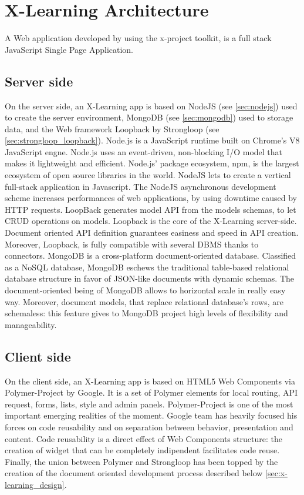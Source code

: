 \section{X-Learning  Architecture}
\label{sec:x-learning_architecture}

A Web application developed by using the x-project toolkit, is a full stack JavaScript Single Page Application.


\subsection{Server side}
\label{subsec:server_side}

On the server side, an X-Learning app is based on NodeJS (see \ref{sec:nodejs}) used to create the server environment, MongoDB (see \ref{sec:mongodb}) used to storage data, and the Web framework Loopback by Strongloop (see \ref{sec:strongloop_loopback}).
Node.js is a JavaScript runtime built on Chrome’s  V8  JavaScript  engne. Node.js uses an event-driven, non-blocking I/O model that makes it lightweight and efficient. Node.js’ package ecosystem, npm, is the largest ecosystem of open source libraries in the world. NodeJS lets to create a vertical full-stack application in Javascript. The NodeJS asynchronous development scheme increases performances of web applications, by using downtime caused  by  HTTP requests.
LoopBack generates model API from the models schemas, to let CRUD operations on models. Loopback is the core of the X-Learning server-side. Document oriented API definition guarantees easiness and speed in API creation. Moreover, Loopback, is fully compatible with several DBMS thanks to connectors.
MongoDB is a cross-platform document-oriented database.  Classified as a NoSQL database, MongoDB eschews the traditional table-based relational database structure in favor of JSON-like documents with dynamic schemas. The document-oriented being of MongoDB allows to horizontal scale in really easy way. Moreover, document models, that replace relational database’s rows, are schemaless: this feature gives to MongoDB project high levels of flexibility and manageability.

\subsection{Client side}
\label{subsec:client_side}

On the client side, an X-Learning app is based on HTML5 Web Components via Polymer-Project by Google. It is a set of Polymer elements for local routing, API request, forms, lists, style and admin panels.
Polymer-Project is one of the most important emerging realities of the moment. Google team has heavily focused his forces on code reusability and on separation between behavior, presentation and content.  Code reusability is a direct effect of Web Components structure: the creation of widget that can be completely indipendent facilitates code reuse.
Finally, the union between Polymer and Strongloop has been topped by the creation of the document oriented development process described below \ref{sec:x-learning_design}.

